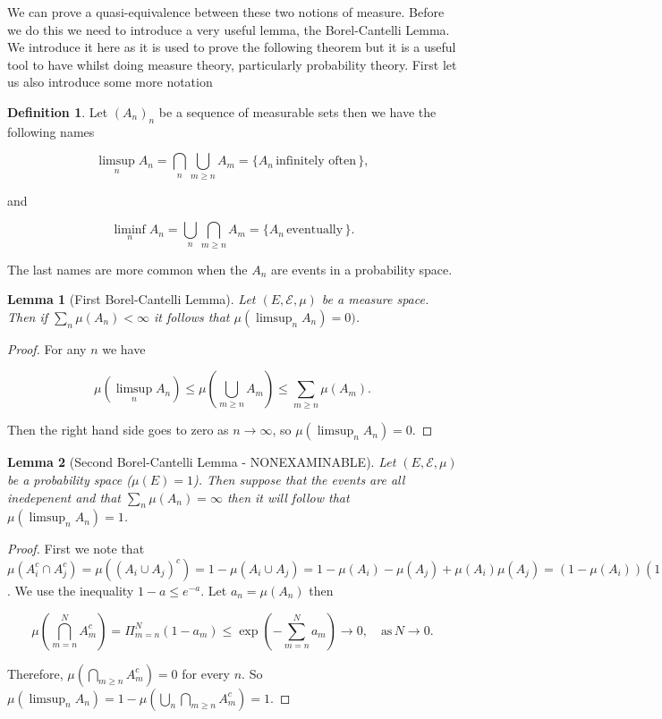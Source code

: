 \documentclass[
]{book}
\newtheorem{lemma}{Lemma}[chapter]
\theoremstyle{definition}
\newtheorem{definition}{Definition}[chapter]
\theoremstyle{definition}
\theoremstyle{definition}
\theoremstyle{definition}
\theoremstyle{remark}
\begin{document}
We can prove a quasi-equivalence between these two notions of measure. Before we do this we need to introduce a very useful lemma, the Borel-Cantelli Lemma. We introduce it here as it is used to prove the following theorem but it is a useful tool to have whilst doing measure theory, particularly probability theory. First let us also introduce some more notation

\begin{definition}
Let \((A_n)_n\) be a sequence of measurable sets then we have the following names

\[ \limsup_n A_n = \bigcap_n \bigcup_{m \geq n} A_m = \{ A_n \, \mbox{infinitely often}\,\}, \]

and

\[ \liminf_n A_n = \bigcup_n \bigcap_{m \geq n} A_m = \{ A_n \, \mbox{eventually}\,\}. \]

The last names are more common when the \(A_n\) are events in a probability space.
\end{definition}

\begin{lemma}[First Borel-Cantelli Lemma]
Let \((E, \mathcal{E}, \mu)\) be a measure space. Then if \(\sum_n \mu(A_n) < \infty\) it follows that \(\mu(\limsup_n A_n) = 0)\).
\end{lemma}

\begin{proof}
For any \(n\) we have

\[ \mu(\limsup_n A_n) \leq \mu \left( \bigcup_{m \geq n} A_m\right) \leq \sum_{m \geq n} \mu(A_m). \]

Then the right hand side goes to zero as \(n \rightarrow \infty\), so \(\mu(\limsup_n A_n) = 0\).
\end{proof}

\begin{lemma}[Second Borel-Cantelli Lemma - NONEXAMINABLE]
Let \((E, \mathcal{E}, \mu)\) be a probability space (\(\mu(E) =1\)). Then suppose that the events are all inedepenent and that \(\sum_n \mu(A_n) = \infty\) then it will follow that \(\mu(\limsup_n A_n) =1\).
\end{lemma}

\begin{proof}
First we note that \(\mu(A_i^c \cap A_j^c) = \mu ((A_i \cup A_j)^c) = 1 - \mu(A_i \cup A_j) = 1 - \mu(A_i) - \mu(A_j)+ \mu(A_i)\mu(A_j) = (1-\mu(A_i))(1-\mu(A_j))\).
We use the inequality \(1-a \leq e^{-a}\). Let \(a_n = \mu(A_n)\) then

\[ \mu \left( \bigcap_{m=n}^N A_m^c \right) = \Pi_{m=n}^N (1-a_m) \leq \exp \left( - \sum_{m=n}^N a_m \right) \rightarrow 0, \quad \mbox{as}\, N \rightarrow 0. \]

Therefore, \(\mu \left( \bigcap_{m \geq n} A_m^c \right) = 0\) for every \(n\). So \(\mu(\limsup_n A_n ) = 1- \mu(\bigcup_n \bigcap_{m \geq n} A_m^c) = 1\).
\end{proof}
\end{document}
